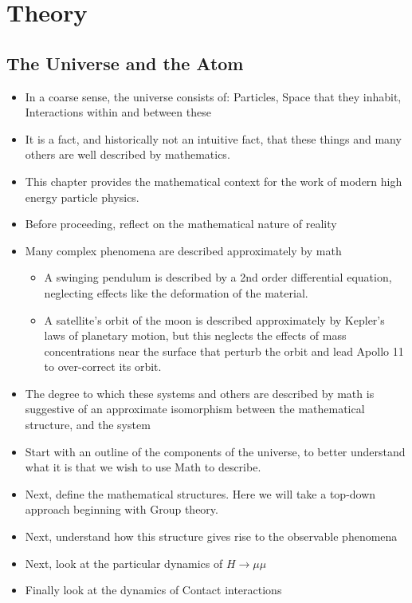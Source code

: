 \chapter{Theory}

\section{The Universe and the Atom}


\begin{itemize}
    \item In a coarse sense, the universe consists of: Particles, Space that they inhabit, Interactions within and between these
    \item It is a fact, and historically not an intuitive fact, that these things and many others are well described by mathematics.
    \item This chapter provides the mathematical context for the work of modern high energy particle physics.
\end{itemize}

\begin{itemize}
    \item Before proceeding, reflect on the mathematical nature of reality
    \item Many complex phenomena are described approximately by math
    \begin{itemize}
        \item A swinging pendulum is described by a 2nd order differential equation, neglecting effects like the deformation of the material.
        \item A satellite's orbit of the moon is described approximately by Kepler's laws of planetary motion, but this neglects the effects of mass concentrations near the surface that perturb the orbit and lead Apollo 11 to over-correct its orbit.
    \end{itemize}
    \item The degree to which these systems and others are described by math is suggestive of an approximate isomorphism between the mathematical structure, and the system
\end{itemize}

\begin{itemize}
    \item Start with an outline of the components of the universe, to better understand what it is that we wish to use Math to describe.
    \item Next, define the mathematical structures. Here we will take a top-down approach beginning with Group theory.
    \item Next, understand how this structure gives rise to the observable phenomena
    \item Next, look at the particular dynamics of $H\to\mu\mu$
    \item Finally look at the dynamics of Contact interactions
\end{itemize}


